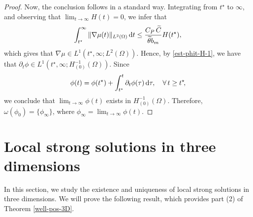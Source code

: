 \documentclass[11pt,reqno]{amsart}
\theoremstyle{remark}
\def\d{{\rm d}}
\def\ddt{\frac{\d}{\d t}}
\numberwithin{equation}{section}
\def\d{{\rm d}}
\begin{document}
\begin{proof}
Now, the conclusion follows in a standard way. Integrating from $t^\star$ to $\infty$, and observing that $\displaystyle \lim_{t \to \infty} H(t)=0$, we infer that
$$
\int_{t^\star}^\infty \| \nabla \mu(t)\|_{L^2(\Omega)} \, \d t
\leq \frac{C_P \, \widetilde{C}}{\widetilde{\theta} b_m}
H(t^\star),
$$
which gives that $\nabla \mu \in L^1(t^\star, \infty; L^2(\Omega))$. Hence, by \eqref{est-phit-H-1}, we have that $\partial_t \phi \in L^1(t^\star, \infty; H^{-1}_{(0)}(\Omega))$. Since
$$
 \phi(t) = \phi(t^\star) +  \int_{t^\star}^t \partial_t \phi(\tau) \, \d \tau, \quad \forall \, t \geq t^\star\!,
$$
we conclude that $\displaystyle\lim_{t \to \infty} \phi(t)$ exists in $H^{-1}_{(0)}(\Omega)$.
Therefore, $\omega(\phi_0)=\lbrace \phi_\infty \rbrace$, where $\phi_\infty= \displaystyle \lim_{t \to \infty} \phi(t)$.
\end{proof}


\section{Local strong solutions in three dimensions}
\label{Local-Strong-3D}

In this section, we study the existence and uniqueness of local strong solutions in three dimensions. We will prove the following result, which provides part (2) of Theorem \ref{well-pos-3D}.
\end{document}
